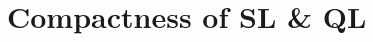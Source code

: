 ﻿%


\setcounter{section}{13}
\section{Compactness of SL \& QL}

\begin{frame}

\scriptsize{\tableofcontents}

\end{frame}

